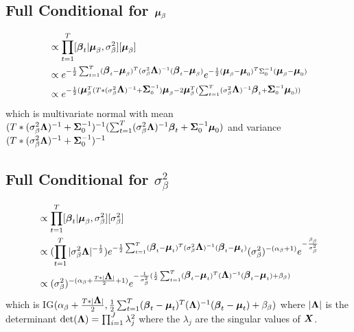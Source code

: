 \documentclass[fleqn]{article}
\def\bm#1{\mbox{\boldmath $#1$}}
\begin{document}
\subsection{Full Conditional for $\bm{\mu}_\beta$}
%
\begin{align*}
[\bm{\mu}_\beta | \cdot] & \propto \prod_{t = 1}^T [\bm{\beta}_t | \bm{\mu}_\beta, \sigma^2_\beta] [\bm{\mu}_\beta]\\
%
& \propto e^{ - \frac{1} {2} \sum_{t = 1}^T (\bm{\beta}_t - \bm{\mu}_\beta)^T (\sigma^2_{\beta} \bm{\Lambda})^{ - 1} (\bm{\beta}_t - \bm{\mu}_\beta)} e^{ - \frac{1} {2} (\bm{\mu}_\beta - \bm{\mu}_0)^T \Sigma_0^{ - 1} (\bm{\mu}_\beta - \bm{\mu}_0)}\\
%
& \propto e^{ - \frac{1} {2} (
\bm{\mu}_\beta^T (T * (\sigma^2_{\beta} \bm{\Lambda})^{ - 1} + \bm{\Sigma}_0^{ - 1}) \bm{\mu}_\beta - 2 \bm{\mu}_\beta^T (\sum_{t = 1}^T (\sigma^2_{\beta} \bm{\Lambda})^{ - 1} \bm{\beta}_t + \bm{\Sigma}_0^{ - 1} \bm{\mu}_0) ) }
\end{align*}
%
which is multivariate normal with mean
$(T * (\sigma^2_{\beta} \bm{\Lambda})^{ - 1} + \bm{\Sigma}_0^{ - 1})^{ - 1} (\sum_{t = 1}^T (\sigma^2_{\beta} \bm{\Lambda})^{ - 1} \bm{\beta}_t + \bm{\Sigma}_0^{ - 1} \bm{\mu}_0)$ and variance $(T * (\sigma^2_{\beta} \bm{\Lambda})^{ - 1} + \bm{\Sigma}_0^{ - 1})^{ - 1}$
%
\subsection{Full Conditional for $\sigma^2_\beta$}
%
\begin{align*}
[\sigma^2_\beta | \cdot] & \propto \prod_{t = 1}^T [\bm{\beta}_t | \bm{\mu}_\beta, \sigma^2_\beta] [\sigma^2_\beta]\\
%
& \propto (\prod_{t = 1}^T |\sigma^2_{\beta} \bm{\Lambda}|^{ - \frac{1} {2}}) e^{ - \frac{1} {2} \sum_{t = 1}^T (\bm{\beta}_t - \bm{\mu}_t)^T (\sigma^2_\beta \bm{\Lambda})^{ - 1} (\bm{\beta}_t - \bm{\mu}_t)} (\sigma^2_\beta)^{ - (\alpha_\beta + 1)} e^{ - \frac{\beta_\beta} {\sigma^2_\beta}}\\
%
& \propto (\sigma^2_\beta)^{ - (\alpha_\beta + \frac{T * |\bm{\Lambda}|} {2} + 1)} e^{ - \frac{1} {\sigma^2_\beta} (\frac{1} {2} \sum_{t = 1}^T (\bm{\beta}_t - \bm{\mu}_t)^T (\bm{\Lambda})^{ - 1} (\bm{\beta}_t - \bm{\mu}_t) + \beta_\beta)}
\end{align*}
%
which is IG$(\alpha_\beta + \frac{T * |\bm{\Lambda}|} {2}, \frac{1} {2} \sum_{t = 1}^T (\bm{\beta}_t - \bm{\mu}_t)^T (\bm{\Lambda})^{ - 1} (\bm{\beta}_t - \bm{\mu}_t) + \beta_\beta)$
%
where $|\bm{\Lambda}|$ is the determinant $\det(\bm{\Lambda}) = \prod_{i = 1}^J \lambda_j^2$ where the $\lambda_j$ are the singular values of $\bm{X}$.
%
\end{document}
